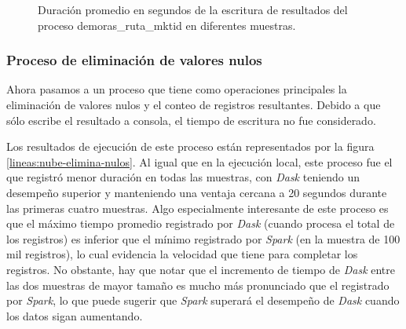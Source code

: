 \begin{figure}
\centering
{}
\caption{Duración promedio en segundos de la escritura de resultados del proceso demoras\_ruta\_mktid en diferentes muestras.}
\label{lineas:nube-demoras-ruta-mktid-write}
\end{figure}

\subsubsection{Proceso de eliminación de valores nulos}

Ahora pasamos a un proceso que tiene como operaciones principales la eliminación de valores nulos y el conteo de registros resultantes. Debido a que sólo escribe el resultado a consola, el tiempo de escritura no fue considerado.

Los resultados de ejecución de este proceso están representados por la figura \ref{lineas:nube-elimina-nulos}. Al igual que en la ejecución local, este proceso fue el que registró menor duración en todas las muestras, con \textit{Dask} teniendo un desempeño superior y manteniendo una ventaja cercana a 20 segundos durante las primeras cuatro muestras. Algo especialmente interesante de este proceso es que el máximo tiempo promedio registrado por \textit{Dask} (cuando procesa el total de los registros) es inferior que el mínimo registrado por \textit{Spark} (en la muestra de 100 mil registros), lo cual evidencia la velocidad que tiene para completar los registros. No obstante, hay que notar que el incremento de tiempo de \textit{Dask} entre las dos muestras de mayor tamaño es mucho más pronunciado que el registrado por \textit{Spark}, lo que puede sugerir que \textit{Spark} superará el desempeño de \textit{Dask} cuando los datos sigan aumentando. 

